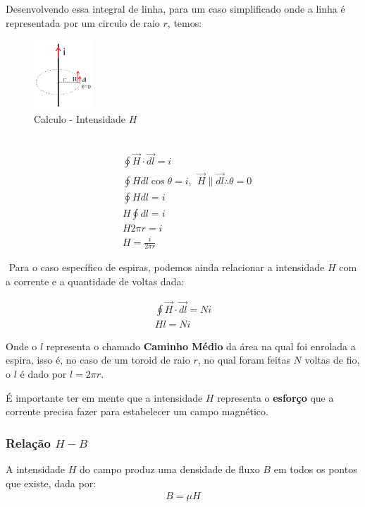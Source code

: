 \documentclass{article}
\newcommand{\n}{\nonumber \\ }
\begin{document}
\newpage

Desenvolvendo essa integral de linha, para um caso simplificado onde a linha é representada por um circulo de raio $r$, temos:

\begin{figure}
    \centering
    \includegraphics[width=0.20\textwidth]{imgs/2023-08-15 11_04_26-1_CIRCUITOS_MAG.pdf - ET520 - Princípios de Conversão de Energia - Visual Studio.png}
    \caption{Calculo - Intensidade $H$}
\end{figure}
$ $
\begin{align}
    &\oint \vec H \cdot \vec{dl} = i \n
    &\oint  H dl \cos \theta = i , \ \  \vec H \parallel \vec{dl} \therefore \theta = 0 \n
    &\oint  H dl = i \n 
    &H \oint  dl = i \n 
    &H 2 \pi r = i \n 
    &H = \frac{i}{2 \pi r }
\end{align}

\vspace{30px}
$ $
Para o caso específico de espiras, podemos ainda relacionar a intensidade $H$ com a corrente e a quantidade de voltas dada:

\begin{align}
    \oint \vec H \cdot \vec{dl} = Ni \n
    H l = Ni
    \label{eq:intensidade_espiras}
\end{align}

Onde o $l$ representa o chamado \textbf{Caminho Médio} da área na qual foi enrolada a espira, isso é, no caso de um toroid de raio $r$, no qual foram feitas $N$ voltas de fio, o $l$ é dado por $l=2\pi r$.

É importante ter em mente que a intensidade $H$ representa o \textbf{esforço} que a corrente precisa fazer para estabelecer um campo magnético.

\subsubsection{Relação $H-B$}
A intensidade $H$ do campo produz uma densidade de fluxo $B$ em todos os pontos que existe, dada por: 
\begin{align}
    B = \mu H
\end{align}
\end{document}
